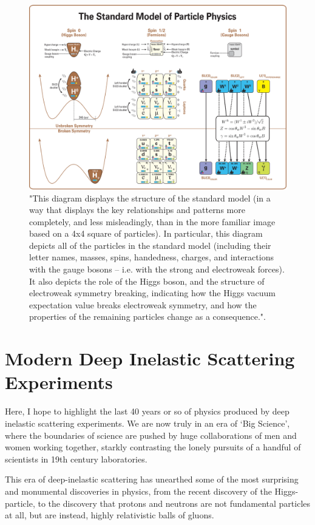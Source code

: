 \begin{figure}[ht]
	\centering
	\includegraphics[width=\linewidth]{./figures/standard_model_complete_lowres.png}
	\caption{
		"This diagram displays the structure of the standard model (in a way that
		displays the key relationships and patterns more completely, and less
		misleadingly, than in the more familiar image based on a 4x4 square of
		particles). In particular, this diagram depicts all of the particles in the
		standard model (including their letter names, masses, spins, handedness,
		charges, and interactions with the gauge bosons -- i.e. with the strong and
		electroweak forces). It also depicts the role of the Higgs boson, and the
		structure of electroweak symmetry breaking, indicating how the Higgs vacuum
		expectation value breaks electroweak symmetry, and how the properties of the
		remaining particles change as a consequence."\cite{Boyle2014}.
	}
	\label{fig:standardmodel}
\end{figure}


\clearpage
\section{Modern Deep Inelastic Scattering Experiments}

Here, I hope to highlight the last 40 years or so of physics produced by deep
inelastic scattering experiments. We are now truly in an era of `Big Science',
where the boundaries of science are pushed by huge collaborations of men and
women working together, starkly contrasting the lonely pursuits of a handful of
scientists in 19th century laboratories.

This era of deep-inelastic scattering has unearthed some of the most surprising
and monumental discoveries in physics, from the recent discovery of the
Higgs-particle, to the discovery that protons and neutrons are not fundamental
particles at all, but are instead, highly relativistic balls of gluons.

